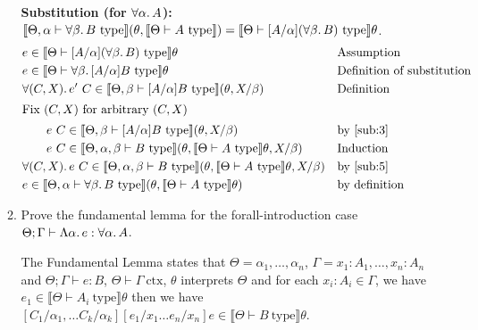 \documentclass[10pt,\jkfside,a4paper]{article}
\newcommand{\type}[1]{\ensuremath{#1\ \text{type}}}
\newcommand{\ctx}[1]{\ensuremath{#1\ \text{ctx}}}
\newcommand{\brk}[1]{\ensuremath{\llbracket #1 \rrbracket}}
\begin{document}
\begin{enumerate}
\begin{enumerate}[label=(\arabic*)]
        \textbf{Substitution (for $\forall \alpha\ldotp A$):}
        $\brk{\Theta, \alpha \vdash \type{\forall \beta\ldotp B}}(\theta, \brk{\Theta \vdash \type{A}}) = \brk{\Theta \vdash \type{[A/\alpha](\forall \beta\ldotp B)}}\theta$.
        \begin{align}
            & e \in \brk{\Theta \vdash \type{[A/\alpha](\forall \beta\ldotp B)}}\theta && \text{Assumption} \\
            & e \in \brk{\Theta \vdash \type{\forall \beta\ldotp [A/\alpha]B}}\theta && \text{Definition of substitution} \\
            & \forall (C, X)\ldotp e'\ C \in \brk{\Theta, \beta \vdash \type{[A/\alpha]B}}(\theta, X/\beta) && \text{Definition} \label{sub:3}\\
            \intertext{Fix $(C, X)$ for arbitrary $(C, X)$}
            & \qquad e\ C \in \brk{\Theta, \beta \vdash \type{[A/\alpha]B}}(\theta, X/\beta) && \text{by \ref{sub:3}} \\
            & \qquad e\ C \in \brk{\Theta, \alpha, \beta \vdash \type{B}}(\theta, \brk{\Theta \vdash \type{A}}\theta, X/\beta) && \text{Induction} \label{sub:5} \\
            & \forall (C, X)\ldotp e\ C \in \brk{\Theta, \alpha, \beta \vdash \type{B}}(\theta, \brk{\Theta \vdash \type{A}}\theta, X/\beta) && \text{by \ref{sub:5}} \\
            & e \in \brk{\Theta, \alpha \vdash \forall \beta\ldotp \type{B}}(\theta, \brk{\Theta \vdash \type{A}}\theta) && \text{by definition}
        \end{align}

        \item Prove the fundamental lemma for the forall-introduction case $\Theta; \Gamma \vdash \Lambda \alpha\ldotp e: \forall \alpha\ldotp A$.

        The Fundamental Lemma states that $\Theta = \alpha_1, \ldots, \alpha_n$, $\Gamma = x_1: A_1, \ldots, x_n: A_n$ and $\Theta; \Gamma \vdash e: B$, $\Theta \vdash \ctx{\Gamma}$, $\theta$ interprets $\Theta$ and
        for each $x_i: A_i \in \Gamma$, we have $e_1 \in \brk{\Theta \vdash \type{A_i}}\theta$ then we have $[C_1/\alpha_1, \ldots C_k / \alpha_k][e_1/x_1\ldots e_n/x_n]e \in \brk{\Theta \vdash \type{B}}\theta$.


\end{enumerate}
\end{enumerate}
\end{document}
